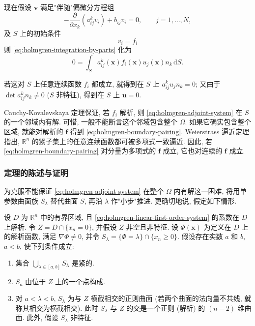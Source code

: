 现在假设 $\bm{v}$ 满足"伴随"偏微分方程组
\begin{equation}\label{eq:holmgren-adjoint-system}
-\dfrac{\partial}{\partial x_k}(a_{ij}^kv_i)+b_{ij}v_i=0,\qquad j=1,\ldots,N,
\end{equation}
及 $S$ 上的初始条件
\begin{equation}\label{eq:holmgren-adjoint-cauchy-data}
v_i=f_i
\end{equation}
则 \eqref{eq:holmgren-integration-by-parts} 化为
\begin{equation}\label{eq:holmgren-boundary-pairing}
0=\int_Sa_{ij}^k(\bm{x})f_i(\bm{x})u_j(\bm{x})n_k\,\mathrm{d}S.
\end{equation}


若这对 $S$ 上任意连续函数 $f_i$ 都成立, 就得到在 $S$ 上 $a_{ij}^ku_jn_k=0$; 又由于 $\det a_{ij}^kn_k\ne0$ ($S$ 非特征), 得到在 $S$ 上 $\bm{u}=0$.

Cauchy-Kovalevskaya 定理保证, 若 $f_i$ 解析, 则 \eqref{eq:holmgren-adjoint-system} 在 $S$ 的一个邻域内有解. 可惜, 一般不能断言这个邻域包含整个 $\Omega$. 如果它确实包含整个区域, 就能对解析的 $\bm{f}$ 得到 \eqref{eq:holmgren-boundary-pairing}. Weierstrass 逼近定理指出, $\mathbb{R}^n$ 的紧子集上的任意连续函数都可被多项式一致逼近. 因此, 若 \eqref{eq:holmgren-boundary-pairing} 对分量为多项式的 $\bm{f}$ 成立, 它也对连续的 $\bm{f}$ 成立.

\subsubsection{定理的陈述与证明}\label{subsec:holmgren-statement-proof}

为克服不能保证 \eqref{eq:holmgren-adjoint-system} 在整个 $\Omega$ 内有解这一困难, 将用单参数曲面族 $S_\lambda$ 替代曲面 $S$, 再沿 $\lambda$ 作"小步"推进. 更确切地说, 假定如下情形.

设 $D$ 为 $\mathbb{R}^n$ 中的有界区域, 且 \eqref{eq:holmgren-linear-first-order-system} 的系数在 $D$ 上解析. 令 $Z=D\cap\{x_n=0\}$, 并假设 $Z$ 非空且非特征. 设 $\Phi(\bm{x})$ 为定义在 $D$ 上的解析函数, 满足 $\nabla\Phi\ne0$, 并令 $S_\lambda=\{\Phi=\lambda\}\cap\{x_n\geq0\}$. 假设存在实数 $a$ 和 $b$, $a<b$, 使下列条件成立:

\begin{enumerate}
\item 集合 $\bigcup_{\lambda\in[a,b]}S_\lambda$ 是紧的.
\item $S_a$ 由位于 $Z$ 上的一个点构成.
\item 对 $a<\lambda<b$, $S_\lambda$ 为与 $Z$ 横截相交的正则曲面 (若两个曲面的法向量不共线, 就称其相交为横截相交). 此时 $S_\lambda$ 与 $Z$ 的交是一个正则 (解析) 的 $(n-2)$ 维曲面. 此外, 假设 $S_\lambda$ 非特征.
\end{enumerate}

